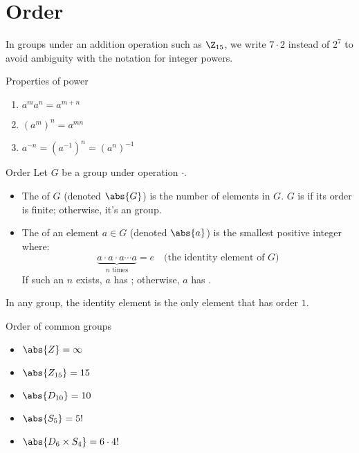 \section{Order}


In groups under an addition operation such as $\Z_{15}$, we write $7 \cdot 2$ instead of $2^7$ to avoid ambiguity with the notation for integer powers.

\begin{thmbox}{Properties of power}{}
    \begin{enumerate}
        \item $a^m a^n = a^{m+n}$
        \item $(a^m)^n = a^{mn}$
        \item $a^{-n} = (a^{-1})^n = (a^n)^{-1}$
    \end{enumerate}
\end{thmbox}

\begin{dfnbox}{Order}{}
    Let $G$ be a group under operation $\cdot$.
    \begin{itemize}
        \item The  of $G$ (denoted $\abs{G}$) is the number of elements in $G$. $G$ is  if its order is finite; otherwise, it's an  group.
        \item The  of an element $a \in G$ (denoted $\abs{a}$) is the smallest positive integer where:
        \[ \underbrace{a \cdot a \cdot a \cdots a}_\text{$n$ times} = e \quad \text{(the identity element of $G$)} \]
        If such an $n$ exists, $a$ has ; otherwise, $a$ has .

    \end{itemize}
\end{dfnbox}

\begin{notebox}
    In any group, the identity element is the only element that has order $1$.
\end{notebox}

\begin{exbox}{Order of common groups}{}
    \begin{itemize}[noitemsep]
        \item $\abs{Z} = \infty$
        \item $\abs{Z_{15}} = 15$
        \item $\abs{D_{10}} = 10$
        \item $\abs{S_5} = 5!$
        \item $\abs{D_6 \times S_4} = 6 \cdot 4!$
    \end{itemize}
\end{exbox}

